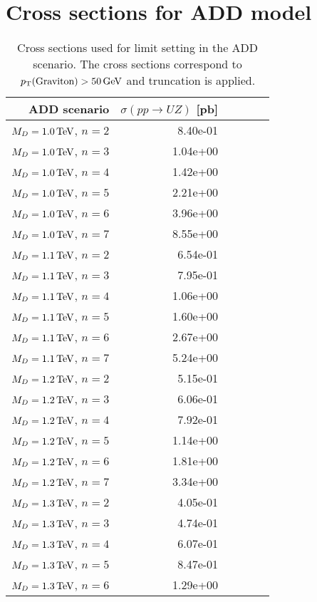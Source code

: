 \chapter{Cross sections for ADD model}
\label{app:add_xs}

\begin{table}[hbtp]
  \caption{
    Cross sections used for limit setting in the ADD scenario. The cross sections correspond to $p_{\mathrm{T}}(\rm Graviton) > 50\,\text{Ge\hspace{-.08em}V}$ and truncation is applied.
  }
  \label{tab:add_xs1}
  \begin{center}
{\footnotesize
  \begin{tabular}{rrrrrr}
\hline 
ADD scenario              & $\sigma(pp\rightarrow UZ)$ [pb]\\
\hline
$M_{D} = 1.0 \,\text{Te\hspace{-.08em}V}$, $n=2$  & 8.40e-01 \\
$M_{D} = 1.0 \,\text{Te\hspace{-.08em}V}$, $n=3$  & 1.04e+00 \\
$M_{D} = 1.0 \,\text{Te\hspace{-.08em}V}$, $n=4$  & 1.42e+00 \\
$M_{D} = 1.0 \,\text{Te\hspace{-.08em}V}$, $n=5$  & 2.21e+00 \\
$M_{D} = 1.0 \,\text{Te\hspace{-.08em}V}$, $n=6$  & 3.96e+00 \\
$M_{D} = 1.0 \,\text{Te\hspace{-.08em}V}$, $n=7$  & 8.55e+00 \\
$M_{D} = 1.1 \,\text{Te\hspace{-.08em}V}$, $n=2$  & 6.54e-01 \\
$M_{D} = 1.1 \,\text{Te\hspace{-.08em}V}$, $n=3$  & 7.95e-01 \\
$M_{D} = 1.1 \,\text{Te\hspace{-.08em}V}$, $n=4$  & 1.06e+00 \\
$M_{D} = 1.1 \,\text{Te\hspace{-.08em}V}$, $n=5$  & 1.60e+00 \\
$M_{D} = 1.1 \,\text{Te\hspace{-.08em}V}$, $n=6$  & 2.67e+00 \\
$M_{D} = 1.1 \,\text{Te\hspace{-.08em}V}$, $n=7$  & 5.24e+00 \\
$M_{D} = 1.2 \,\text{Te\hspace{-.08em}V}$, $n=2$  & 5.15e-01 \\
$M_{D} = 1.2 \,\text{Te\hspace{-.08em}V}$, $n=3$  & 6.06e-01 \\
$M_{D} = 1.2 \,\text{Te\hspace{-.08em}V}$, $n=4$  & 7.92e-01 \\
$M_{D} = 1.2 \,\text{Te\hspace{-.08em}V}$, $n=5$  & 1.14e+00 \\
$M_{D} = 1.2 \,\text{Te\hspace{-.08em}V}$, $n=6$  & 1.81e+00 \\
$M_{D} = 1.2 \,\text{Te\hspace{-.08em}V}$, $n=7$  & 3.34e+00 \\
$M_{D} = 1.3 \,\text{Te\hspace{-.08em}V}$, $n=2$  & 4.05e-01 \\
$M_{D} = 1.3 \,\text{Te\hspace{-.08em}V}$, $n=3$  & 4.74e-01 \\
$M_{D} = 1.3 \,\text{Te\hspace{-.08em}V}$, $n=4$  & 6.07e-01 \\
$M_{D} = 1.3 \,\text{Te\hspace{-.08em}V}$, $n=5$  & 8.47e-01 \\
$M_{D} = 1.3 \,\text{Te\hspace{-.08em}V}$, $n=6$  & 1.29e+00 \\

\end{tabular}}
\end{center}
\end{table}
